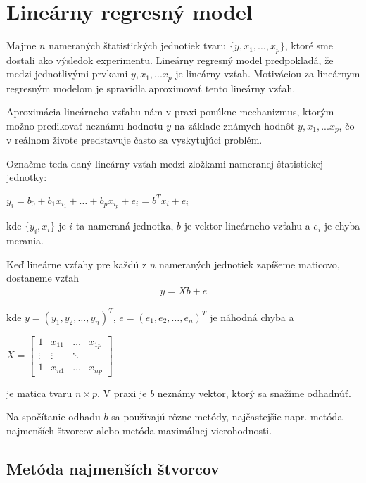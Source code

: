 \section{Lineárny regresný model}
\label{linear regression}
 
Majme $n$ nameraných štatistických jednotiek tvaru $\{ y, x_1, \ldots, x_p \}$, 
ktoré sme dostali ako výsledok experimentu. 
Lineárny regresný model predpokladá, že medzi jednotlivými prvkami $y, x_1, ... x_p$ je lineárny vzťah. 
Motiváciou za lineárnym regresným modelom je spravidla aproximovať tento lineárny vzťah.

Aproximácia lineárneho vzťahu nám v praxi ponúkne mechanizmus, 
ktorým možno predikovať neznámu hodnotu $y$ na základe známych hodnôt $y, x_1, ... x_p$, 
čo v reálnom živote predstavuje často sa vyskytujúci problém.

Označme teda daný lineárny vzťah medzi zložkami nameranej štatistickej jednotky:

\begin{center}
$
y_i = b_0 + b_1 x_{i_1} + … + b_p x_{i_p} + e_i = b^T x_i + e_i
$
\end{center}

kde $\{ y_i, x_i \}$ je $i$-ta nameraná jednotka, $b$ je vektor lineárneho vzťahu
a $e_i$ je chyba merania.

Keď lineárne vzťahy pre každú z $n$ nameraných jednotiek zapíšeme maticovo, dostaneme vzťah
\begin{align}
\label{linear regression formula}
y = Xb + e
\end{align}

kde $y = (y_1, y_2, \ldots, y_n)^T$, $e = (e_1, e_2, \ldots, e_n)^T$ je náhodná chyba a

\begin{center}
$
X =
\begin{bmatrix}
1 & x_{11} & \ldots & x_{1p} \\
\vdots & \vdots & \ddots & \\
1 & x_{n1} & \ldots & x_{np} 
\end{bmatrix}
$
\end{center}

je matica tvaru $n \times p$. V praxi je $b$ neznámy vektor, ktorý sa snažíme odhadnúť.

Na spočítanie odhadu $b$ sa používajú rôzne metódy,
najčastejšie napr. metóda najmenších štvorcov alebo metóda maximálnej vierohodnosti.

\subsection{Metóda najmenších štvorcov}

